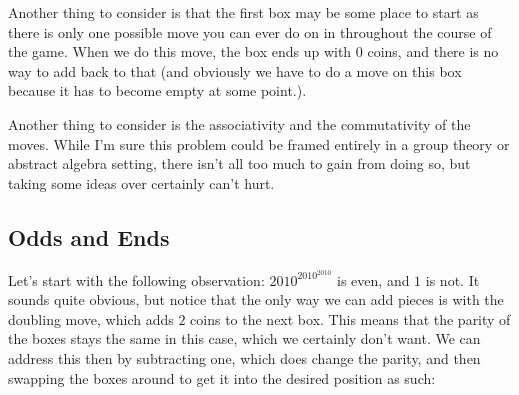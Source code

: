 Another thing to consider is that the first box may be some place to start as
there is only one possible move you can ever do on in throughout the course of
the game. When we do this move, the box ends up with \( 0 \) coins, and there
is no way to add back to that (and obviously we have to do a move on this box
because it has to become empty at some point.).

Another thing to consider is the associativity and the commutativity of the
moves. While I'm sure this problem could be framed entirely in a group theory or
abstract algebra setting, there isn't all too much to gain from doing so, but
taking some ideas over certainly can't hurt.

\subsection{Odds and Ends}

Let's start with the following observation: \( 2010^{2010^{2010}} \) is even,
and \( 1 \) is not. It sounds quite obvious, but notice that the only way we
can add pieces is with the doubling move, which adds \( 2 \) coins to the next
box. This means that the parity of the boxes stays the same in this case, which
we certainly don't want. We can address this then  by subtracting one, which does change the
parity, and then swapping the boxes around to get it into the desired position
as such:

\vspace{0.3cm}


\let\boxdiagram\undefined
